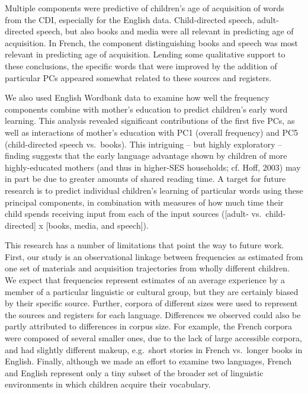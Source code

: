 \documentclass[10pt, letterpaper]{article}
\begin{document}
Multiple components were predictive of children's age of acquisition of
words from the CDI, especially for the English data. Child-directed
speech, adult-directed speech, but also books and media were all
relevant in predicting age of acquisition. In French, the component
distinguishing books and speech was most relevant in predicting age of
acquisition. Lending some qualitative support to these conclusions, the
specific words that were improved by the addition of particular PCs
appeared somewhat related to these sources and registers.

We also used English Wordbank data to examine how well the frequency
components combine with mother's education to predict children's early
word learning. This analysis revealed significant contributions of the
first five PCs, as well as interactions of mother's education with PC1
(overall frequency) and PC5 (child-directed speech vs.~books). This
intriguing -- but highly exploratory -- finding suggests that the early
language advantage shown by children of more highly-educated mothers
(and thus in higher-SES households; cf. Hoff, 2003) may in part be due
to greater amounts of shared reading time. A target for future research
is to predict individual children's learning of particular words using
these principal components, in combination with measures of how much
time their child spends receiving input from each of the input sources
({[}adult- vs.~child-directed{]} x {[}books, media, and speech{]}).

This research has a number of limitations that point the way to future
work. First, our study is an observational linkage between frequencies
as estimated from one set of materials and acquisition trajectories from
wholly different children. We expect that frequencies represent
estimates of an average experience by a member of a particular
linguistic or cultural group, but they are certainly biased by their
specific source. Further, corpora of different sizes were used to
represent the sources and registers for each language. Differences we
observed could also be partly attributed to differences in corpus size.
For example, the French corpora were composed of several smaller ones,
due to the lack of large accessible corpora, and had slightly different
makeup, e.g.~short stories in French vs.~longer books in English.
Finally, although we made an effort to examine two languages, French and
English represent only a tiny subset of the broader set of linguistic
environments in which children acquire their vocabulary.
\end{document}
